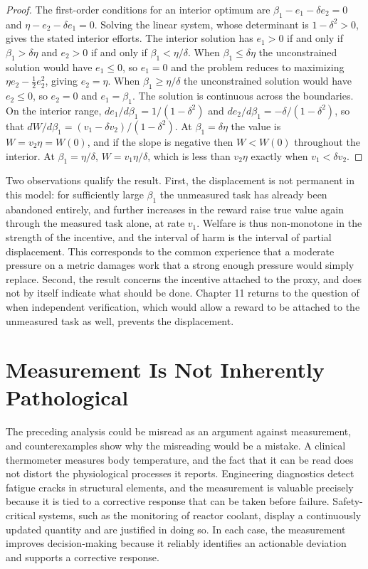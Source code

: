 \documentclass[11pt]{report}
\theoremstyle{definition}
\theoremstyle{remark}
\begin{document}
\begin{proof}
The first-order conditions for an interior optimum are $\beta_1-e_1-\delta e_2=0$ and $\eta-e_2-\delta e_1=0$. Solving the linear system, whose determinant is $1-\delta^2>0$, gives the stated interior efforts. The interior solution has $e_1>0$ if and only if $\beta_1>\delta\eta$ and $e_2>0$ if and only if $\beta_1<\eta/\delta$. When $\beta_1\le\delta\eta$ the unconstrained solution would have $e_1\le0$, so $e_1=0$ and the problem reduces to maximizing $\eta e_2-\tfrac12e_2^2$, giving $e_2=\eta$. When $\beta_1\ge\eta/\delta$ the unconstrained solution would have $e_2\le0$, so $e_2=0$ and $e_1=\beta_1$. The solution is continuous across the boundaries. On the interior range, $de_1/d\beta_1=1/(1-\delta^2)$ and $de_2/d\beta_1=-\delta/(1-\delta^2)$, so that $dW/d\beta_1=(v_1-\delta v_2)/(1-\delta^2)$. At $\beta_1=\delta\eta$ the value is $W=v_2\eta=W(0)$, and if the slope is negative then $W<W(0)$ throughout the interior. At $\beta_1=\eta/\delta$, $W=v_1\eta/\delta$, which is less than $v_2\eta$ exactly when $v_1<\delta v_2$.
\end{proof}

Two observations qualify the result. First, the displacement is not permanent in this model: for sufficiently large $\beta_1$ the unmeasured task has already been abandoned entirely, and further increases in the reward raise true value again through the measured task alone, at rate $v_1$. Welfare is thus non-monotone in the strength of the incentive, and the interval of harm is the interval of partial displacement. This corresponds to the common experience that a moderate pressure on a metric damages work that a strong enough pressure would simply replace. Second, the result concerns the incentive attached to the proxy, and does not by itself indicate what should be done. Chapter 11 returns to the question of when independent verification, which would allow a reward to be attached to the unmeasured task as well, prevents the displacement.

\section{Measurement Is Not Inherently Pathological}

The preceding analysis could be misread as an argument against measurement, and counterexamples show why the misreading would be a mistake. A clinical thermometer measures body temperature, and the fact that it can be read does not distort the physiological processes it reports. Engineering diagnostics detect fatigue cracks in structural elements, and the measurement is valuable precisely because it is tied to a corrective response that can be taken before failure. Safety-critical systems, such as the monitoring of reactor coolant, display a continuously updated quantity and are justified in doing so. In each case, the measurement improves decision-making because it reliably identifies an actionable deviation and supports a corrective response.
\end{document}
